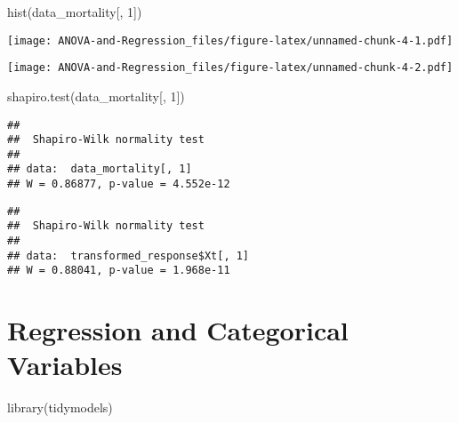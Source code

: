 \documentclass[
]{book}
\newenvironment{Shaded}{\begin{snugshade}}{\end{snugshade}}
\newcommand{\DecValTok}[1]{\textcolor[rgb]{0.00,0.00,0.81}{#1}}
\newcommand{\FunctionTok}[1]{\textcolor[rgb]{0.00,0.00,0.00}{#1}}
\newcommand{\NormalTok}[1]{#1}
\newcommand{\SpecialCharTok}[1]{\textcolor[rgb]{0.00,0.00,0.00}{#1}}
\begin{document}
\begin{Shaded}
\begin{Highlighting}[]
\FunctionTok{hist}\NormalTok{(data\_mortality[, }\DecValTok{1}\NormalTok{])}
\end{Highlighting}
\end{Shaded}

\texttt{[image: ANOVA-and-Regression\_files/figure-latex/unnamed-chunk-4-1.pdf]}

\begin{Shaded}
\end{Shaded}

\texttt{[image: ANOVA-and-Regression\_files/figure-latex/unnamed-chunk-4-2.pdf]}

\begin{Shaded}
\begin{Highlighting}[]
\FunctionTok{shapiro.test}\NormalTok{(data\_mortality[, }\DecValTok{1}\NormalTok{])}
\end{Highlighting}
\end{Shaded}

\begin{verbatim}
## 
##  Shapiro-Wilk normality test
## 
## data:  data_mortality[, 1]
## W = 0.86877, p-value = 4.552e-12
\end{verbatim}

\begin{Shaded}
\end{Shaded}

\begin{verbatim}
## 
##  Shapiro-Wilk normality test
## 
## data:  transformed_response$Xt[, 1]
## W = 0.88041, p-value = 1.968e-11
\end{verbatim}

\hypertarget{regression-and-categorical-variables}{%
\section{Regression and Categorical Variables}\label{regression-and-categorical-variables}}

\begin{Shaded}
\begin{Highlighting}[]
\FunctionTok{library}\NormalTok{(tidymodels)}
\end{Highlighting}
\end{Shaded}
\end{document}
